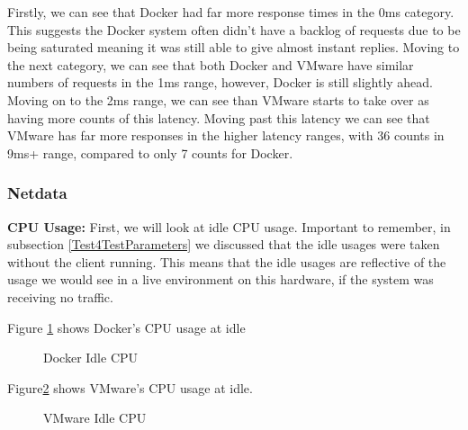Firstly, we can see that Docker had far more response times in the 0ms category. This suggests the Docker system often didn't have a backlog of requests due to be being saturated meaning it was still able to give almost instant replies. Moving to the next category, we can see that both Docker and VMware have similar numbers of requests in the 1ms range, however, Docker is still slightly ahead. Moving on to the 2ms range, we can see than VMware starts to take over as having more counts of this latency. Moving past this latency we can see that VMware has far more responses in the higher latency ranges, with 36 counts in 9ms+ range, compared to only 7 counts for Docker.

\subsubsection{Netdata}
\textbf{CPU Usage:}
First, we will look at idle CPU usage. Important to remember, in subsection \ref{Test4TestParameters} we discussed that the idle usages were taken without the client running. This means that the idle usages are reflective of the usage we would see in a live environment on this hardware, if the system was receiving no traffic.

Figure \ref{fig:DockerCPUIdle} shows Docker's CPU usage at idle
\begin{figure}[H]
\caption{Docker Idle CPU}
\label{fig:DockerCPUIdle}
\centering
\end{figure}


Figure\ref{fig:VMwareCPUIdle} shows VMware's CPU usage at idle.
\begin{figure}[H]
\caption{VMware Idle CPU}
\label{fig:VMwareCPUIdle}
\centering
\end{figure}

